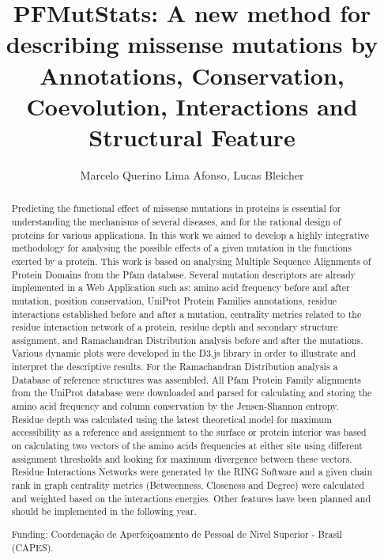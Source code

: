 \documentclass[twoside]{article}
\title{\vspace{-15mm}\fontsize{24pt}{10pt}\selectfont\textbf{ PFMutStats: A new method for describing missense mutations by Annotations,  Conservation,  Coevolution,  Interactions and Structural Feature }} %
\author{ Marcelo Querino Lima Afonso, Lucas Bleicher }
\affil{ Universidade Federal de Minas Gerais }
\date{}
\begin{document}
  
  
  \maketitle %
  
  
  \thispagestyle{fancy} %
  
  
  \begin{abstract}
  Predicting the functional effect of missense mutations in proteins is essential for understanding the mechanisms of several diseases,  and for the rational design of proteins for various applications. In this work we aimed to develop a highly integrative methodology for analysing the possible effects of a given mutation in the functions exerted by a protein. This work is based on analysing Multiple Sequence Alignments of Protein Domains from the Pfam database. Several mutation descriptors are already implemented in a Web Application such as: amino acid frequency before and after mutation,  position conservation,  UniProt Protein Families annotations,  residue interactions established before and after a mutation,  centrality metrics related to the residue interaction network of a protein,  residue depth and secondary structure assignment,  and Ramachandran Distribution analysis before and after the mutations. Various dynamic plots were developed in the D3.js library in order to illustrate and interpret the descriptive results. For the Ramachandran Distribution analysis a Database of reference structures was assembled. All Pfam Protein Family alignments from the UniProt database were downloaded and parsed for calculating and storing the amino acid frequency and column conservation by the Jensen-Shannon entropy. Residue depth was calculated using the latest theoretical model for maximum accessibility as a reference and assignment to the surface or protein interior was based on calculating two vectors of the amino acids frequencies at either site using different assignment thresholds and looking for maximum divergence between these vectors. Residue Interactions Networks were generated by the RING Software and a given chain rank in graph centrality metrics (Betweenness,  Closeness and Degree) were calculated and weighted based on the interactions energies. Other features have been planned and should be implemented in the following year.
  
  Funding: Coordena\c{c}\~ao de Aperfei\c{c}oamento de Pessoal de N\'{\i}vel Superior - Brasil (CAPES). \\ 
  \end{abstract}
  
\end{document}
